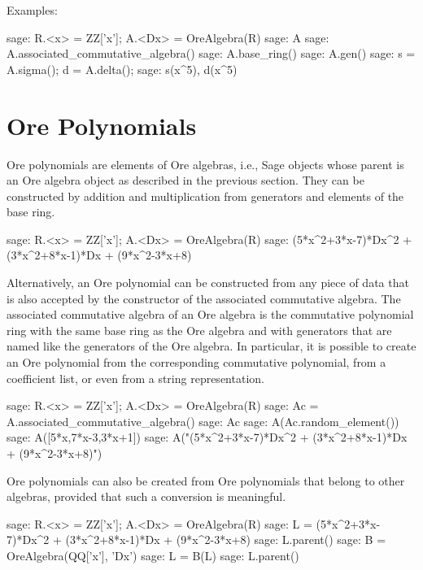\documentclass{llncs}
\begin{document}
\smallskip\goodbreak

Examples: 

\begin{sageexample}
  sage: R.<x> = ZZ['x']; A.<Dx> = OreAlgebra(R)
  sage: A
  sage: A.associated_commutative_algebra()
  sage: A.base_ring()
  sage: A.gen()
  sage: s = A.sigma(); d = A.delta(); 
  sage: s(x^5), d(x^5)
\end{sageexample}

\section{Ore Polynomials}\label{sec:3}

Ore polynomials are elements of Ore algebras, i.e., Sage objects whose parent is an Ore algebra
object as described in the previous section. They can be constructed by addition and multiplication
from generators and elements of the base ring. 

\begin{sageexample}
  sage: R.<x> = ZZ['x']; A.<Dx> = OreAlgebra(R)
  sage: (5*x^2+3*x-7)*Dx^2 + (3*x^2+8*x-1)*Dx + (9*x^2-3*x+8)
\end{sageexample}

Alternatively, an Ore polynomial can be constructed from any piece of data that is also accepted
by the constructor of the associated commutative algebra. The associated commutative algebra of
an Ore algebra is the commutative polynomial ring with the same base ring as the Ore algebra 
and with generators that are named like the generators of the Ore algebra. In particular, it is
possible to create an Ore polynomial from the corresponding commutative polynomial, from a 
coefficient list, or even from a string representation.

\begin{sageexample}
  sage: R.<x> = ZZ['x']; A.<Dx> = OreAlgebra(R)
  sage: Ac = A.associated_commutative_algebra()
  sage: Ac
  sage: A(Ac.random_element())
  sage: A([5*x,7*x-3,3*x+1])
  sage: A("(5*x^2+3*x-7)*Dx^2 + (3*x^2+8*x-1)*Dx + (9*x^2-3*x+8)")
\end{sageexample}

Ore polynomials can also be created from Ore polynomials that belong to other algebras, provided
that such a conversion is meaningful. 

\begin{sageexample}
  sage: R.<x> = ZZ['x']; A.<Dx> = OreAlgebra(R)
  sage: L = (5*x^2+3*x-7)*Dx^2 + (3*x^2+8*x-1)*Dx + (9*x^2-3*x+8)
  sage: L.parent()
  sage: B = OreAlgebra(QQ['x'], 'Dx')
  sage: L = B(L)
  sage: L.parent()
\end{sageexample}
\end{document}
